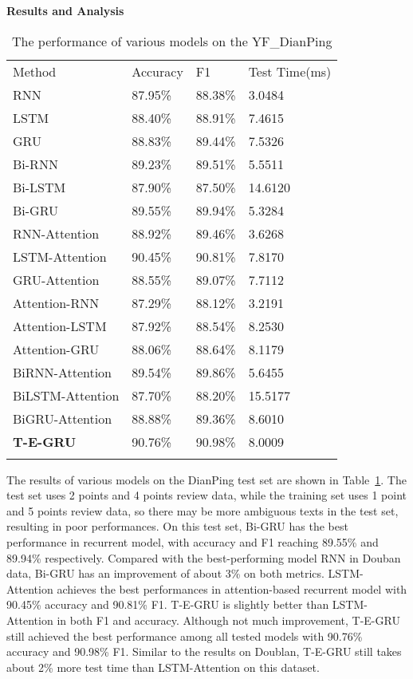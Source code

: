 \textbf{Results and Analysis}
\begin{table}
	\caption{The performance of various models on the YF\_DianPing}
	\label{tab:DianPing-Result}       
	\begin{tabular}{llll}
		\hline\noalign{\smallskip}
	    Method 						& Accuracy 		    &F1			        &Test Time(ms)\\
		\noalign{\smallskip}\hline\noalign{\smallskip}
	    RNN~\cite{RNN-first}    	    &87.95\%            &88.38\%            &3.0484\\
		LSTM~\cite{hochreiter1997LSTM}	&88.40\% 			&88.91\% 	        &7.4615\\
		GRU~\cite{cho2014learningGRU}	&88.83\%  			&89.44\%	        &7.5326\\
		Bi-RNN						    &89.23\%			&89.51\%	        &5.5511\\
		Bi-LSTM						    &87.90\%			&87.50\%	        &14.6120\\
		Bi-GRU						    &89.55\%	        &89.94\%	        &5.3284\\
		\noalign{\smallskip}\hline\noalign{\smallskip}
		RNN-Attention				    &88.92\%			&89.46\%	        &3.6268\\
		LSTM-Attention				    &90.45\%            &90.81\%	        &7.8170\\
		GRU-Attention				    &88.55\%			&89.07\%	        &7.7112\\
		Attention-RNN				    &87.29\%			&88.12\%	        &3.2191\\
		Attention-LSTM				    &87.92\%			&88.54\%	        &8.2530\\		
		Attention-GRU				    &88.06\%			&88.64\%	        &8.1179\\
	    BiRNN-Attention			        &89.54\%			&89.86\%	        &5.6455\\
		BiLSTM-Attention			    &87.70\%			&88.20\%	        &15.5177\\
		BiGRU-Attention			        &88.88\%			&89.36\%	        &8.6010\\
		\noalign{\smallskip}\hline\noalign{\smallskip}
		\textbf{T-E-GRU}			    &90.76\%	        &90.98\%	        &8.0009\\	
		\noalign{\smallskip}\hline
	\end{tabular}
\end{table}
The results of various models on the DianPing test set are shown in Table~\ref{tab:DianPing-Result}. The test set uses 2 points and 4 points review data, while the training set uses 1 point and 5 points review data, so there may be more ambiguous texts in the test set, resulting in poor performances. 
On this test set, Bi-GRU has the best performance in recurrent model, with accuracy and F1 reaching 89.55\% and 89.94\% respectively. Compared with the best-performing model RNN in Douban data, Bi-GRU has an improvement of about 3\% on both metrics. 
LSTM-Attention achieves the best performances in attention-based recurrent model with 90.45\% accuracy and 90.81\% F1.
T-E-GRU is slightly better than LSTM-Attention in both F1 and accuracy. Although not much improvement, T-E-GRU still achieved the best performance among all tested models with 90.76\% accuracy and 90.98\% F1. Similar to the results on Doublan, T-E-GRU still takes about 2\% more test time than LSTM-Attention on this dataset.

